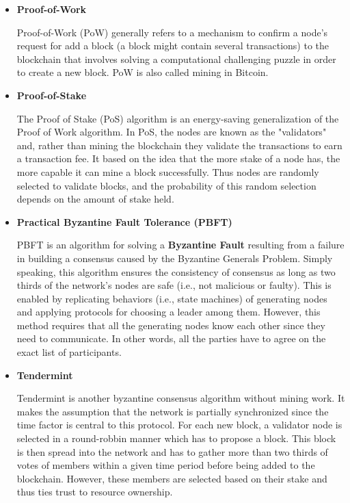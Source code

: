 \begin{itemize}
	\item \textbf{Proof-of-Work}
	
	Proof-of-Work (PoW) generally refers to a mechanism to confirm a node’s request for add a block (a block might contain several transactions) to the blockchain that involves solving a computational challenging puzzle in order to create a new block. PoW is also called mining in Bitcoin.
	
	\item \textbf{Proof-of-Stake}
	
	The Proof of Stake (PoS) algorithm is an energy-saving generalization of the Proof of Work algorithm. In PoS, the nodes are known as the "validators" and, rather than mining the blockchain they validate the transactions to earn a transaction fee. It based on the idea that the more stake of a node has, the more capable it can mine a block successfully. Thus nodes are randomly selected to validate blocks, and the probability of this random selection depends on the amount of stake held.
	
	\item \textbf{ Practical Byzantine Fault Tolerance (PBFT)}
	
	PBFT is an algorithm for solving a \textbf{Byzantine Fault} resulting from a failure in building a consensus caused by the Byzantine Generals Problem. Simply speaking, this algorithm ensures the consistency of consensus as long as two thirds of the network’s nodes are safe (i.e., not malicious or faulty). This is enabled by replicating behaviors (i.e., state machines) of generating nodes and applying protocols for choosing a leader among them. However,
	this method requires that all the generating nodes know each
	other since they need to communicate. In other words, all the
	parties have to agree on the exact list of participants.
	\cite{pbft}
	
	\item \textbf{Tendermint \cite{tendermint}}
	
    Tendermint is another byzantine consensus algorithm without mining work. It makes the assumption that the network is partially synchronized since the time factor is central to this protocol. For each new block, a validator node is selected in a round-robbin manner which has to propose a block. This block is then spread into the
    network and has to gather more than two thirds of votes of
    members within a given time period before being added to
    the blockchain. However, these members are selected based
    on their stake and thus ties trust to resource ownership.
\end{itemize}

